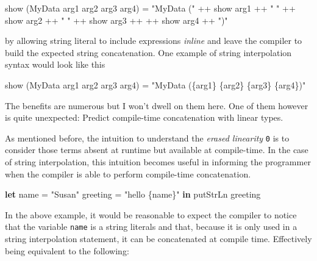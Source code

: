 \documentclass[
]{article}
\newenvironment{Shaded}{}{}
\newcommand{\DataTypeTok}[1]{\textcolor[rgb]{0.56,0.13,0.00}{#1}}
\newcommand{\FunctionTok}[1]{\textcolor[rgb]{0.02,0.16,0.49}{#1}}
\newcommand{\KeywordTok}[1]{\textcolor[rgb]{0.00,0.44,0.13}{\textbf{#1}}}
\newcommand{\NormalTok}[1]{#1}
\newcommand{\OperatorTok}[1]{\textcolor[rgb]{0.40,0.40,0.40}{#1}}
\newcommand{\OtherTok}[1]{\textcolor[rgb]{0.00,0.44,0.13}{#1}}
\newcommand{\StringTok}[1]{\textcolor[rgb]{0.25,0.44,0.63}{#1}}
\begin{document}
\begin{Shaded}
\begin{Highlighting}[]
\FunctionTok{show}\NormalTok{ (}\DataTypeTok{MyData}\NormalTok{ arg1 arg2 arg3 arg4) }\OtherTok{=} \StringTok{"MyData ("} \OperatorTok{++} \FunctionTok{show}\NormalTok{ arg1 }\OperatorTok{++} \StringTok{" "} \OperatorTok{++} \FunctionTok{show}\NormalTok{ arg2 }\OperatorTok{++} \StringTok{" "} \OperatorTok{++} \FunctionTok{show}\NormalTok{ arg3 }\OperatorTok{++} \OperatorTok{++} \FunctionTok{show}\NormalTok{ arg4 }\OperatorTok{++} \StringTok{")"}
\end{Highlighting}
\end{Shaded}

by allowing string literal to include expressions \emph{inline} and
leave the compiler to build the expected string concatenation. One
example of string interpolation syntax would look like this

\begin{Shaded}
\begin{Highlighting}[]
\FunctionTok{show}\NormalTok{ (}\DataTypeTok{MyData}\NormalTok{ arg1 arg2 arg3 arg4) }\OtherTok{=} \StringTok{"MyData (\{arg1\} \{arg2\} \{arg3\} \{arg4\})"}
\end{Highlighting}
\end{Shaded}

The benefits are numerous but I won't dwell on them here. One of them
however is quite unexpected: Predict compile-time concatenation with
linear types.

As mentioned before, the intuition to understand the \emph{erased
linearity} \texttt{0} is to consider those terms absent at runtime but
available at compile-time. In the case of string interpolation, this
intuition becomes useful in informing the programmer when the compiler
is able to perform compile-time concatenation.

\begin{Shaded}
\begin{Highlighting}[]
\KeywordTok{let}\NormalTok{ name }\OtherTok{=} \StringTok{"Susan"}
\NormalTok{    greeting }\OtherTok{=} \StringTok{"hello \{name\}"} \KeywordTok{in}
    \FunctionTok{putStrLn}\NormalTok{ greeting}
\end{Highlighting}
\end{Shaded}

In the above example, it would be reasonable to expect the compiler to
notice that the variable \texttt{name} is a string literals and that,
because it is only used in a string interpolation statement, it can be
concatenated at compile time. Effectively being equivalent to the
following:
\end{document}

